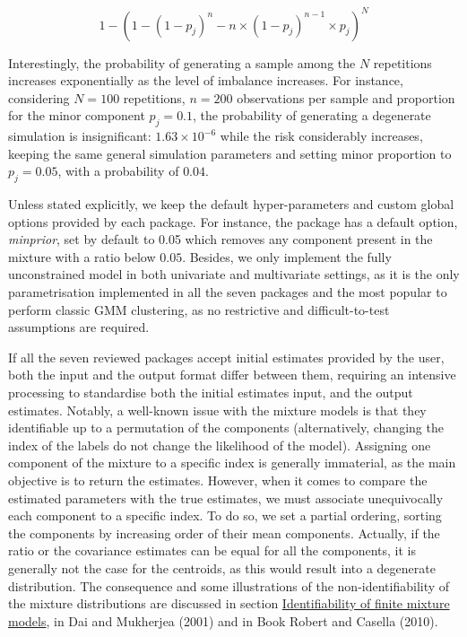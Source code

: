 \begin{equation}
1 - \left(1 - (1-p_j)^n - n \times (1-p_j)^{n-1}\times p_j\right)^N
\label{eq:random-sampling-risk}
\end{equation}

Interestingly, the probability of generating a sample among the \(N\) repetitions increases exponentially as the level of imbalance increases. For instance, considering \(N=100\) repetitions, \(n=200\) observations per sample and proportion for the minor component \(p_j=0.1\), the probability of generating a degenerate simulation is insignificant: \(1.63 \times 10^{-6}\) while the risk considerably increases, keeping the same general simulation parameters and setting minor proportion to \(p_j=0.05\), with a probability of \(0.04\).

Unless stated explicitly, we keep the default hyper-parameters and custom global options provided by each package. For instance, the  package has a default option, \emph{minprior}, set by default to 0.05 which removes any component present in the mixture with a ratio below \(0.05\). Besides, we only implement the fully unconstrained model in both univariate and multivariate settings, as it is the only parametrisation implemented in all the seven packages and the most popular to perform classic GMM clustering, as no restrictive and difficult-to-test assumptions are required.

If all the seven reviewed packages accept initial estimates provided by the user, both the input and the output format differ between them, requiring an intensive processing to standardise both the initial estimates input, and the output estimates. Notably, a well-known issue with the mixture models is that they identifiable up to a permutation of the components (alternatively, changing the index of the labels do not change the likelihood of the model). Assigning one component of the mixture to a specific index is generally immaterial, as the main objective is to return the estimates. However, when it comes to compare the estimated parameters with the true estimates, we must associate unequivocally each component to a specific index. To do so, we set a partial ordering, sorting the components by increasing order of their mean components. Actually, if the ratio or the covariance estimates can be equal for all the components, it is generally not the case for the centroids, as this would result into a degenerate distribution. The consequence and some illustrations of the non-identifiability of the mixture distributions are discussed in section \href{https://stats.stackexchange.com/questions/265898/why-is-a-normal-mixture-model-not-identifiable-and-why-does-it-matter}{Identifiability of finite mixture models}, in Dai and Mukherjea (2001) and in Book Robert and Casella (2010).

